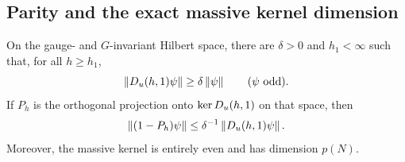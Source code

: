 \subsection{Parity and the exact massive kernel dimension}

\begin{lemma}\label{lem:large-coupling-gap}
On the gauge- and \(G\)-invariant Hilbert space, there are \(\delta>0\)
and \(h_1<\infty\) such that, for all \(h\ge h_1\),
\begin{equation}\label{count:odd-gap}
 \left\lVert D_u(h,1)\psi\right\rVert\ge\delta\left\lVert \psi\right\rVert
                         \qquad(\psi\text{ odd}).
\end{equation}
If \(P_h\) is the orthogonal projection onto \(\operatorname{ker} D_u(h,1)\) on that
space, then
\begin{equation}\label{count:full-gap}
 \left\lVert (1-P_h)\psi\right\rVert\le\delta^{-1}\left\lVert D_u(h,1)\psi\right\rVert.
\end{equation}
Moreover, the massive kernel is entirely even and has dimension \(p(N)\).
\end{lemma}

